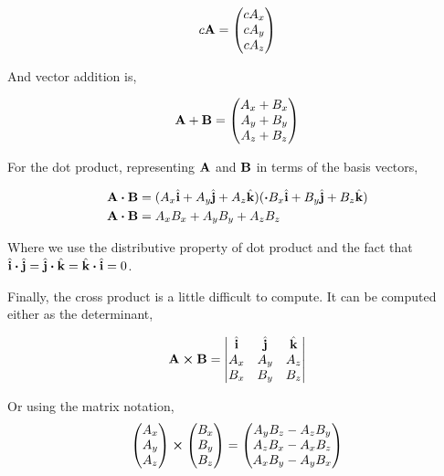 \[
    c\boldsymbol{\mathbf{A}} = 
    \begin{pmatrix}
        cA_x \\
        cA_y \\
        cA_z
    \end{pmatrix}
\]

And vector addition is,

\[
    \boldsymbol{\mathbf{A}} + \boldsymbol{\mathbf{B}} = 
    \begin{pmatrix}
        A_x + B_x\\
        A_y + B_y\\
        A_z + B_z 
    \end{pmatrix}
\]

For the dot product, representing \(\boldsymbol{\mathbf{A}}\) and \(\boldsymbol{\mathbf{B}}\) in terms of the basis vectors,

\begin{align*}
    \Aa \dtp \BB &= (A_x \unitv{i} + A_y \unitv{j} + A_z \unitv{k}) (\dtp B_x \unitv{i} + B_y \unitv{j} + B_z \unitv{k}) \\
    \Aa \dtp \BB &= A_xB_x + A_yB_y + A_zB_z
\end{align*}

Where we use the distributive property of dot product and the fact 
that \(\unitv{i} \dtp \unitv{j} = \unitv{j} \dtp \unitv{k} = \unitv{k} \dtp \unitv{i} = 0\).

Finally, the cross product is a little difficult to compute.
It can be computed either as the determinant,

\[\Aa \cp \BB =
\begin{vmatrix}
    \unitv{i} & \unitv{j} & \unitv{k} \\
    A_x & A_y & A_z \\
    B_x & B_y & B_z
\end{vmatrix}\]

Or using the matrix notation,
\[
\begin{pmatrix}
    A_x \\
    A_y \\
    A_z
\end{pmatrix} \cp
%
\begin{pmatrix}
    B_x \\
    B_y \\
    B_z
\end{pmatrix}
%
=
%
\begin{pmatrix}
    A_yB_z - A_zB_y \\
    A_zB_x - A_xB_z \\
    A_xB_y - A_yB_x
\end{pmatrix}
\]

